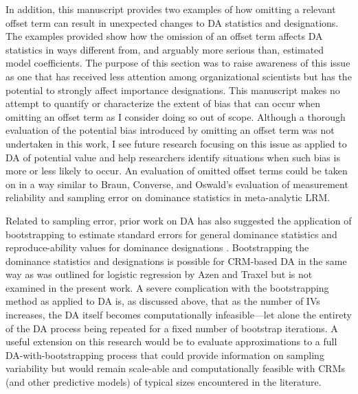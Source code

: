 \documentclass[ShortAfour,times,sageapa]{sagej}
\begin{document}
	In addition, this manuscript provides two examples of how omitting a relevant offset term can result in unexpected changes to DA statistics and designations.
	The examples provided show how the omission of an offset term affects DA statistics in ways different from, and arguably more serious than, estimated model coefficients.
	The purpose of this section was to raise awareness of this issue as one that has received less attention among organizational scientists but has the potential to strongly affect importance designations.
	This manuscript makes no attempt to quantify or characterize the extent of bias that can occur when omitting an offset term as I consider doing so out of scope.
	Although a thorough evaluation of the potential bias introduced by omitting an offset term was not undertaken in this work, I see future research focusing on this issue as applied to DA of potential value and help researchers identify situations when such bias is more or less likely to occur.
	An evaluation of omitted offset terms could be taken on in a way similar to Braun, Converse, and Oswald's \citeyear{braun2019accuracy} evaluation of measurement reliability and sampling error on dominance statistics in meta-analytic LRM.
	
	Related to sampling error, prior work on DA has also suggested the application of bootstrapping to estimate standard errors for general dominance statistics and reproduce-ability values for dominance designations \cite{azen2009using,braun2019accuracy}. 
	Bootstrapping the dominance statistics and designations is possible for CRM-based DA in the same way as was outlined for logistic regression by Azen and Traxel \citeyear{azen2009using} but is not examined in the present work.
	A severe complication with the bootstrapping method as applied to DA is, as discussed above, that as the number of IVs increases, the DA itself becomes computationally infeasible---let alone the entirety of the DA process being repeated for a fixed number of bootstrap iterations.
	A useful extension on this research would be to evaluate approximations to a full DA-with-bootstrapping process that could provide information on sampling variability but would remain scale-able and computationally feasible with CRMs (and other predictive models) of typical sizes encountered in the literature.
	
\end{document}
